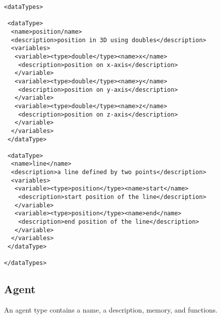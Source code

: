 \begin{mylisting}
\begin{verbatim}
<dataTypes>

 <dataType>
  <name>position/name>
  <description>position in 3D using doubles</description>
  <variables>
   <variable><type>double</type><name>x</name>
    <description>position on x-axis</description>
   </variable>
   <variable><type>double</type><name>y</name>
    <description>position on y-axis</description>
   </variable>
   <variable><type>double</type><name>z</name>
    <description>position on z-axis</description>
   </variable>
  </variables>
 </dataType>

 <dataType>
  <name>line</name>
  <description>a line defined by two points</description>
  <variables>
   <variable><type>position</type><name>start</name>
    <description>start position of the line</description>
   </variable>
   <variable><type>position</type><name>end</name>
    <description>end position of the line</description>
   </variable>
  </variables>
 </dataType>

</dataTypes>
\end{verbatim}
\end{mylisting}

\subsection{Agent}

An agent type contains a name, a description, memory, and functions. 

